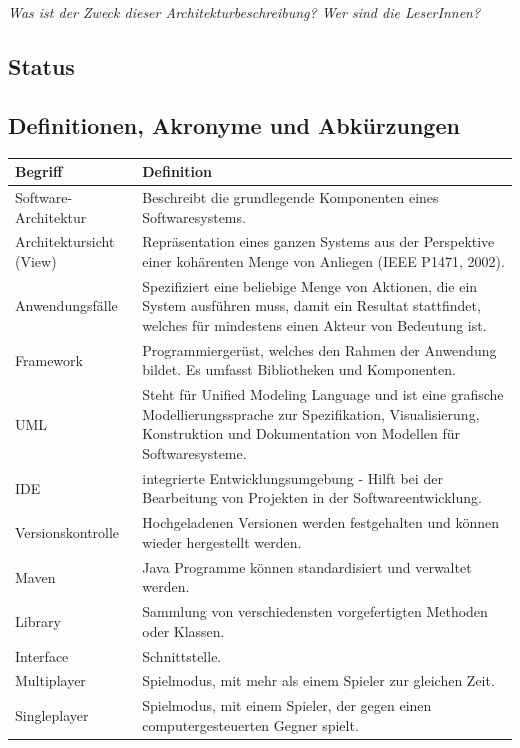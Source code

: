 \documentclass[fontsize=12pt,paper=a4,twoside]{scrartcl}
\begin{document}
{ \em Was ist der Zweck dieser Architekturbeschreibung? Wer sind die LeserInnen?}

\subsection{Status}
  
\subsection{Definitionen, Akronyme und Abkürzungen}
  \begin{longtable}{ |  l | p{12cm} |}
    \hline
    Begriff & Definition \\ \hline
Software-Architektur &Beschreibt die grundlegende Komponenten eines
Softwaresystems.\\ \hline
Architektursicht (View) &Repräsentation eines ganzen Systems
aus der Perspektive einer kohärenten Menge von
Anliegen (IEEE P1471, 2002). \\ \hline
 Anwendungsfälle & Spezifiziert eine beliebige Menge von Aktionen, die
ein System ausführen muss, damit ein Resultat stattfindet,
welches für mindestens einen Akteur von Bedeutung
ist. \\ \hline
    Framework &Programmiergerüst, welches den Rahmen der Anwendung
bildet. Es umfasst Bibliotheken und Komponenten. \\ \hline
    UML &Steht für Unified Modeling Language und ist eine grafische
Modellierungssprache zur Spezifikation, Visualisierung,
Konstruktion und Dokumentation von Modellen
für Softwaresysteme. \\
    \hline
IDE & integrierte Entwicklungsumgebung - Hilft bei der Bearbeitung von Projekten
in der Softwareentwicklung. \\     \hline
Versionskontrolle  &Hochgeladenen Versionen werden festgehalten und können
wieder hergestellt werden. \\     \hline
 Maven  &Java Programme können standardisiert und verwaltet werden.\\     \hline
 Library &Sammlung von verschiedensten vorgefertigten Methoden oder Klassen.\\     \hline
Interface &Schnittstelle.\\     \hline
Multiplayer &Spielmodus, mit mehr als einem Spieler zur gleichen Zeit.\\    \hline
Singleplayer &Spielmodus, mit einem Spieler, der gegen einen computergesteuerten
Gegner spielt. \\     \hline

\end{longtable}
\end{document}
